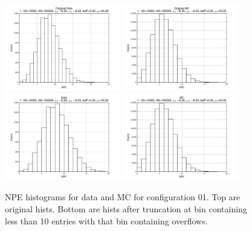  \begin{figure}[htbp] \begin{center} 
\includegraphics[width=0.45\textwidth]{../FIGURES/01/FIG_Original_Data.pdf} 
\includegraphics[width=0.45\textwidth]{../FIGURES/01/FIG_Original_MC.pdf} 
\includegraphics[width=0.45\textwidth]{../FIGURES/01/FIG_Data.pdf} 
\includegraphics[width=0.45\textwidth]{../FIGURES/01/FIG_MC.pdf} 
\caption{NPE histograms for data and MC for configuration 01. Top are original hists. Bottom are hists after truncation at bin containing less than 10 entries with that bin containing overflows.} 
\label{tab:npe_01} 
\end{center} \end{figure} 

 